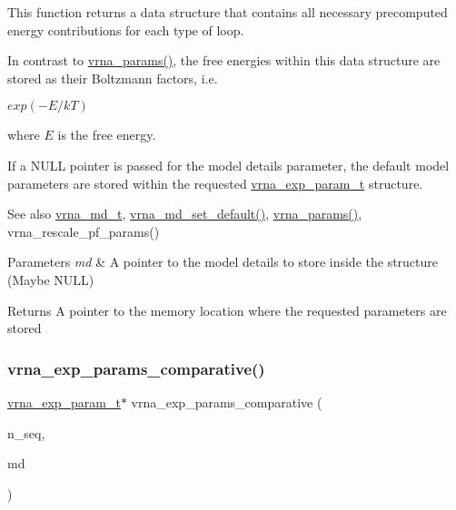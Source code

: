 This function returns a data structure that contains all necessary precomputed energy contributions for each type of loop.

In contrast to \mbox{\hyperlink{group__energy__parameters_gad0e3e7e74bdc50d1709d40c92993185e}{vrna\+\_\+params()}}, the free energies within this data structure are stored as their Boltzmann factors, i.\+e.

$ exp(-E / kT) $

where $ E $ is the free energy.

If a N\+U\+LL pointer is passed for the model details parameter, the default model parameters are stored within the requested \mbox{\hyperlink{group__energy__parameters_ga01d8b92fe734df8d79a6169482c7d8d8}{vrna\+\_\+exp\+\_\+param\+\_\+t}} structure.

\begin{DoxySeeAlso}{See also}
\mbox{\hyperlink{group__model__details_ga1f8a10e12a0a1915f2a4eff0b28ea17c}{vrna\+\_\+md\+\_\+t}}, \mbox{\hyperlink{group__model__details_ga8ac6ff84936282436f822644bf841f66}{vrna\+\_\+md\+\_\+set\+\_\+default()}}, \mbox{\hyperlink{group__energy__parameters_gad0e3e7e74bdc50d1709d40c92993185e}{vrna\+\_\+params()}}, vrna\+\_\+rescale\+\_\+pf\+\_\+params()
\end{DoxySeeAlso}

\begin{DoxyParams}{Parameters}
{\em md} & A pointer to the model details to store inside the structure (Maybe N\+U\+LL) \\
\hline
\end{DoxyParams}
\begin{DoxyReturn}{Returns}
A pointer to the memory location where the requested parameters are stored 
\end{DoxyReturn}
\mbox{\label{group__energy__parameters_gaf78c09e685e6eef4100b1a41d4042550}} 
\subsubsection{\texorpdfstring{vrna\_exp\_params\_comparative()}{vrna\_exp\_params\_comparative()}}
{\footnotesize\ttfamily \mbox{\hyperlink{group__energy__parameters_ga01d8b92fe734df8d79a6169482c7d8d8}{vrna\+\_\+exp\+\_\+param\+\_\+t}}$\ast$ vrna\+\_\+exp\+\_\+params\+\_\+comparative (\begin{DoxyParamCaption}\item[{unsigned int}]{n\+\_\+seq,  }\item[{\mbox{\hyperlink{group__model__details_ga1f8a10e12a0a1915f2a4eff0b28ea17c}{vrna\+\_\+md\+\_\+t}} $\ast$}]{md }\end{DoxyParamCaption})}



